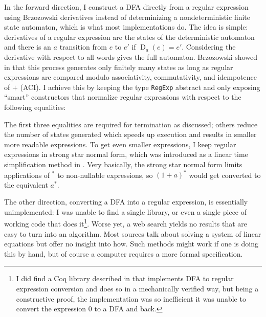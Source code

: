 \documentclass[11pt]{article}
\DeclareMathOperator{\derivative}{D}
\newcommand{\haskell}{\lstinline}
\begin{document}
In the forward direction, I construct a DFA directly from a regular expression using Brzozowski derivatives instead of determinizing a nondeterministic finite state automaton, which is what most implementations do. The idea is simple: derivatives of a regular expression are the states of the deterministic automaton and there is an $a$ transition from $e$ to $e'$ if $\derivative_a{(e)} = e'$. Considering the derivative with respect to all words gives the full automaton. Brzozowski showed in \cite{Brzozowski64} that this process generates only finitely many states as long as regular expressions are compared modulo associativity, commutativity, and idempotence of $+$ (ACI). I achieve this by keeping the type \haskell{RegExp} abstract and only exposing ``smart'' constructors that normalize regular expressions with respect to the following equalities:
The first three equalities are required for termination as discussed; others reduce the number of states generated which speeds up execution and results in smaller more readable expressions. To get even smaller expressions, I keep regular expressions in strong star normal form, which was introduced as a linear time simplification method in \cite{GruberG10}. Very basically, the strong star normal form limits applications of $^*$ to non-nullable expressions, so $(1 + a)^*$ would get converted to the equivalent $a^*$.


The other direction, converting a DFA into a regular expression, is essentially unimplemented: I was unable to find a single library, or even a single piece of working code that does it\footnote{%
  I did find a Coq library described in \cite{DoczkalKS13} that implements DFA to regular expression conversion and does so in a mechanically verified way, but being a constructive proof, the implementation was so inefficient it was unable to convert the expression $0$ to a DFA and back.}.
  Worse yet, a web search yields no results that are easy to turn into an algorithm. Most sources talk about solving a system of linear equations but offer no insight into how. Such methods might work if one is doing this by hand, but of course a computer requires a more formal specification.
\end{document}
